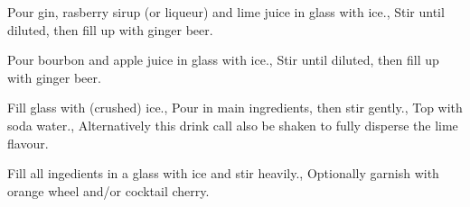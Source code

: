 \documentclass[../main.tex]{subfiles}
\begin{document}
    \cocktailDivider

    {
            {Pour gin, rasberry sirup (or liqueur) and lime juice in glass with ice.},
            {Stir until diluted, then fill up with ginger beer.}
    }
    {}

    \cocktailDivider

    {
            {Pour bourbon and apple juice in glass with ice.},
            {Stir until diluted, then fill up with ginger beer.}
    }
    {}

    \cocktailDivider

    {
            {Fill glass with (crushed) ice.},
            {Pour in main ingredients, then stir gently.},
            {Top with soda water.},
            {Alternatively this drink call also be shaken to fully disperse the lime flavour.}
    }
    {}

    \cocktailDivider

    {
        Fill all ingedients in a glass with ice and stir heavily.,
        Optionally garnish with orange wheel and/or cocktail cherry.
    }
    {}

    \clearpage
\end{document}
